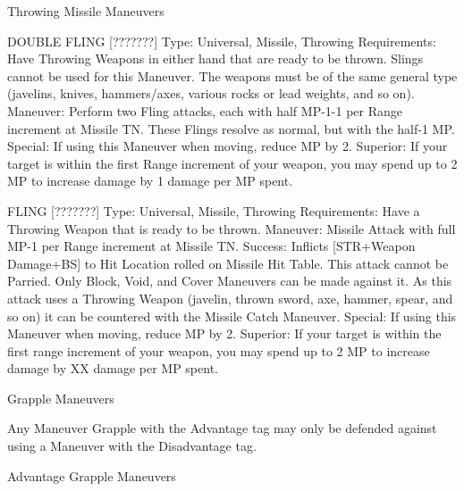 \documentclass[oneside,11pt,english]{book}
\begin{document}
 

Throwing Missile Maneuvers 

 

DOUBLE FLING [???????] 
Type: Universal, Missile, Throwing 
Requirements: Have Throwing Weapons in either hand that are ready to be thrown. Slings cannot be 
used for this Maneuver. The weapons must be of the same general type (javelins, knives, hammers/axes, 
various rocks or lead weights, and so on). 
Maneuver: Perform two Fling attacks, each with half MP-1-1 per Range increment at Missile TN. These 
Flings resolve as normal, but with the half-1 MP. 
Special: If using this Maneuver when moving, reduce MP by 2. 
Superior: If your target is within the first Range increment of your weapon, you may spend up to 2 MP to 
increase damage by 1 damage per MP spent. 

 

 

FLING [???????] 
Type: Universal, Missile, Throwing 
Requirements: Have a Throwing Weapon that is ready to be thrown. 
Maneuver: Missile Attack with full MP-1 per Range increment at Missile TN. 
Success: Inflicts [STR+Weapon Damage+BS] to Hit Location rolled on Missile Hit Table. 
This attack cannot be Parried. Only Block, Void, and Cover Maneuvers can be made against it. 
As this attack uses a Throwing Weapon (javelin, thrown sword, axe, hammer, spear, and so on) it can be 
countered with the Missile Catch Maneuver. 
Special: If using this Maneuver when moving, reduce MP by 2. 
Superior: If your target is within the first range increment of your weapon, you may spend up to 2 MP to 
increase damage by XX damage per MP spent. 


 

 

Grapple Maneuvers 

 

Any Maneuver Grapple with the Advantage tag may only be defended against using a Maneuver with the 
Disadvantage tag. 

 

 

Advantage Grapple Maneuvers 

 
\end{document}
